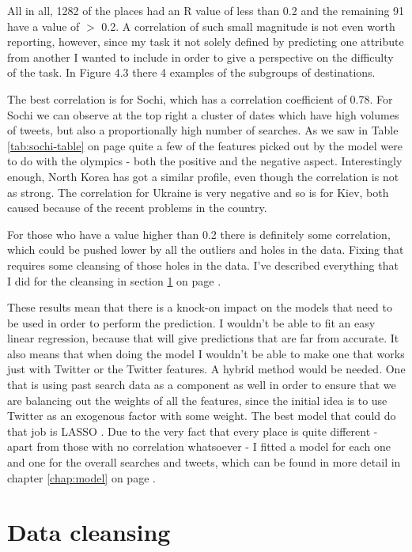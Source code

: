 \documentclass[minf,frontabs,twoside,singlespacing,parskip]{infthesis}
\begin{document}
All in all, 1282 of the places had an R value of less than 0.2 and the remaining 91 have a value of $>$ 0.2. A correlation of such small magnitude is not even worth reporting, however, since my task it not solely defined by predicting one attribute from another I wanted to include in order to give a perspective on the difficulty of the task. In Figure 4.3 there 4 examples of the subgroups of destinations. 


The best correlation is for Sochi, which has a correlation coefficient of 0.78. For Sochi we can observe at the top right a cluster of dates which have high volumes of tweets, but also a proportionally high number of searches. As we saw in Table \ref{tab:sochi-table} on page \pageref{tab:sochi-table} quite a few of the features picked out by the model were to do with the olympics - both the positive and the negative aspect. Interestingly enough, North Korea has got a similar profile, even though the correlation is not as strong. The correlation for Ukraine is very negative and so is for Kiev, both caused because of the recent problems in the country.


For those who have a value higher than 0.2 there is definitely some correlation, which could be pushed lower by all the outliers and holes in the data. Fixing that requires some cleansing of those holes in the data. I've described everything that I did for the cleansing in section \ref{sec:cleansing} on page \pageref{sec:cleansing}.


These results mean that there is a knock-on impact on the models that need to be used in order to perform the prediction. I wouldn't be able to fit an easy linear regression, because that will give predictions that are far from accurate. It also means that when doing the model I wouldn't be able to make one that works just with Twitter or the Twitter features. A hybrid method would be needed. One that is using past search data as a component as well in order to ensure that we are balancing out the weights of all the features, since the initial idea is to use Twitter as an exogenous factor with some weight. The best model that could do that job is LASSO \cite{lasso}. Due to the very fact that every place is quite different - apart from those with no correlation whatsoever - I fitted a model for each one and one for the overall searches and tweets, which can be found in more detail in chapter \ref{chap:model} on page \pageref{chap:model}.


\section{Data cleansing}
\label{sec:cleansing}
\end{document}
